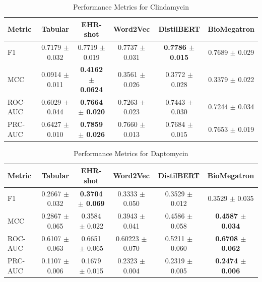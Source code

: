 \documentclass{article}
\theoremstyle{plain}
\theoremstyle{definition}
\theoremstyle{remark}
\begin{document}
\begin{table}[h!]
\caption{Performance Metrics for Clindamycin}
\label{table-clindamycin}
\vskip 0.15in
\begin{center}
\begin{small}
\begin{sc}
\begin{adjustbox}{width=5in}
\begin{tabular}{l|ccccc}
\toprule
Metric & Tabular & EHR-shot & Word2Vec & DistilBERT & BioMegatron \\
\midrule
F1 & 0.7179 $\pm$ 0.032 & 0.7719 $\pm$ 0.019 & 0.7737 $\pm$ 0.031 & \textbf{0.7786 $\pm$ 0.015} & 0.7689 $\pm$ 0.029 \\
MCC & 0.0914 $\pm$ 0.011 & \textbf{0.4162 $\pm$ 0.0624} & 0.3561 $\pm$ 0.026 & 0.3772 $\pm$ 0.028 & 0.3379 $\pm$ 0.022 \\
ROC-AUC & 0.6029 $\pm$ 0.044 & \textbf{0.7664 $\pm$ 0.020} & 0.7263 $\pm$ 0.023 & 0.7443 $\pm$ 0.030 & 0.7244 $\pm$ 0.034 \\
PRC-AUC & 0.6427 $\pm$ 0.010 & \textbf{0.7859 $\pm$ 0.026} & 0.7660 $\pm$ 0.013 & 0.7684 $\pm$ 0.015 & 0.7653 $\pm$ 0.019 \\
\bottomrule
\end{tabular}
\end{adjustbox}
\end{sc}
\end{small}
\end{center}
\vskip -0.1in
\end{table}


\begin{table}[h!]
\caption{Performance Metrics for Daptomycin}
\label{table-daptomycin}
\vskip 0.15in
\begin{center}
\begin{small}
\begin{sc}
\begin{adjustbox}{width=5in}
\begin{tabular}{l| ccccc}
\toprule
Metric & Tabular & EHR-shot & Word2Vec & DistilBERT & BioMegatron \\
\midrule
F1 & 0.2667 $\pm$ 0.032 & \textbf{0.3704 $\pm$ 0.069} & 0.3333 $\pm$ 0.050 & 0.3529 $\pm$ 0.012 & 0.3529 $\pm$ 0.035 \\
MCC & 0.2867 $\pm$ 0.065 & 0.3584 $\pm$ 0.022 & 0.3943 $\pm$ 0.041 & 0.4586 $\pm$ 0.058 & \textbf{0.4587 $\pm$ 0.034} \\
ROC-AUC & 0.6107 $\pm$ 0.063 & 0.6651 $\pm$ 0.065 & 0.60223 $\pm$ 0.070 & 0.5211 $\pm$ 0.060 & \textbf{0.6708 $\pm$ 0.062} \\
PRC-AUC & 0.1107 $\pm$ 0.006 & 0.1679 $\pm$ 0.015 & 0.2323 $\pm$ 0.004 & 0.2319 $\pm$ 0.005 & \textbf{0.2474 $\pm$ 0.006} \\
\bottomrule
\end{tabular}
\end{adjustbox}
\end{sc}
\end{small}
\end{center}
\vskip -0.1in
\end{table}
\end{document}
